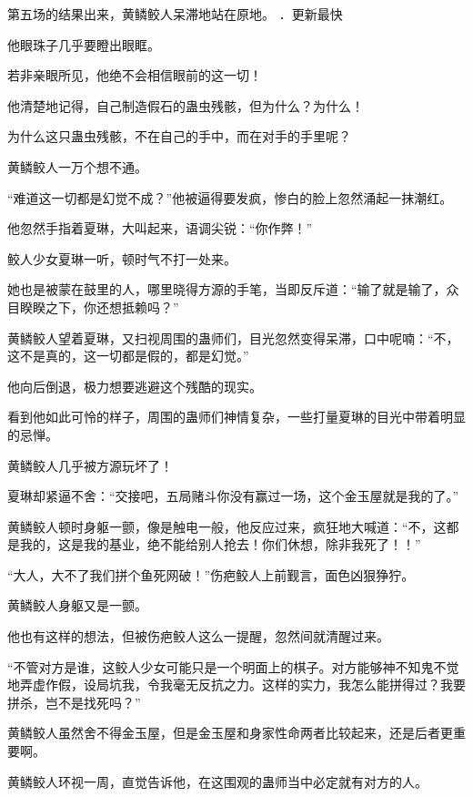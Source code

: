 
\begin{this_body}

第五场的结果出来，黄鳞鲛人呆滞地站在原地。 ．更新最快

他眼珠子几乎要瞪出眼眶。

若非亲眼所见，他绝不会相信眼前的这一切！

他清楚地记得，自己制造假石的蛊虫残骸，但为什么？为什么！

为什么这只蛊虫残骸，不在自己的手中，而在对手的手里呢？

黄鳞鲛人一万个想不通。

“难道这一切都是幻觉不成？”他被逼得要发疯，惨白的脸上忽然涌起一抹潮红。

他忽然手指着夏琳，大叫起来，语调尖锐：“你作弊！”

鲛人少女夏琳一听，顿时气不打一处来。

她也是被蒙在鼓里的人，哪里晓得方源的手笔，当即反斥道：“输了就是输了，众目睽睽之下，你还想抵赖吗？”

黄鳞鲛人望着夏琳，又扫视周围的蛊师们，目光忽然变得呆滞，口中呢喃：“不，这不是真的，这一切都是假的，都是幻觉。”

他向后倒退，极力想要逃避这个残酷的现实。

看到他如此可怜的样子，周围的蛊师们神情复杂，一些打量夏琳的目光中带着明显的忌惮。

黄鳞鲛人几乎被方源玩坏了！

夏琳却紧逼不舍：“交接吧，五局赌斗你没有赢过一场，这个金玉屋就是我的了。”

黄鳞鲛人顿时身躯一颤，像是触电一般，他反应过来，疯狂地大喊道：“不，这都是我的，这是我的基业，绝不能给别人抢去！你们休想，除非我死了！！”

“大人，大不了我们拼个鱼死网破！”伤疤鲛人上前觐言，面色凶狠狰狞。

黄鳞鲛人身躯又是一颤。

他也有这样的想法，但被伤疤鲛人这么一提醒，忽然间就清醒过来。

“不管对方是谁，这鲛人少女可能只是一个明面上的棋子。对方能够神不知鬼不觉地弄虚作假，设局坑我，令我毫无反抗之力。这样的实力，我怎么能拼得过？我要拼杀，岂不是找死吗？”

黄鳞鲛人虽然舍不得金玉屋，但是金玉屋和身家性命两者比较起来，还是后者更重要啊。

黄鳞鲛人环视一周，直觉告诉他，在这围观的蛊师当中必定就有对方的人。


\end{this_body}
